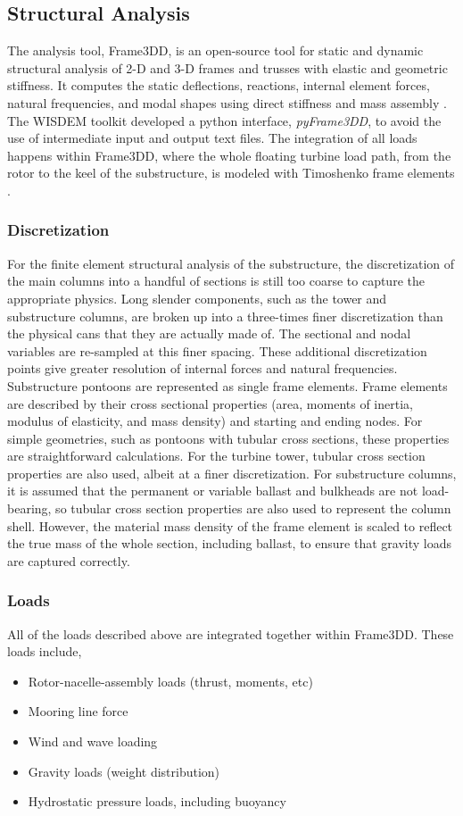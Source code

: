 \subsection{Structural Analysis}
The analysis tool, Frame3DD, is an open-source tool for static and
dynamic structural analysis of 2-D and 3-D frames and trusses with
elastic and geometric stiffness. It computes the static deflections,
reactions, internal element forces, natural frequencies, and modal
shapes using direct stiffness and mass assembly \citep{frame3dd}.  The
WISDEM toolkit developed a python interface, \textit{pyFrame3DD}, to
avoid the use of intermediate input and output text files.  The
integration of all loads happens within Frame3DD, where the whole floating
turbine load path, from the rotor to the keel of the substructure, is
modeled with Timoshenko frame elements \citep{timoshenko}.

\subsubsection{Discretization}
For the finite element structural analysis of the substructure, the
discretization of the main columns into a handful of sections is still
too coarse to capture the appropriate physics. Long slender components,
such as the tower and substructure columns, are broken up into a
three-times finer discretization than the physical cans that they are
actually made of.  The sectional and nodal variables are re-sampled at
this finer spacing.  These additional discretization points give greater
resolution of internal forces and natural frequencies.  Substructure
pontoons are represented as single frame elements.  Frame elements are
described by their cross sectional properties (area, moments of inertia,
modulus of elasticity, and mass density) and starting and ending nodes.
For simple geometries, such as pontoons with tubular cross sections,
these properties are straightforward calculations.  For the turbine
tower, tubular cross section properties are also used, albeit at a finer
discretization.  For substructure columns, it is assumed that the
permanent or variable ballast and bulkheads are not load-bearing, so
tubular cross section properties are also used to represent the column
shell.  However, the material mass density of the frame element is
scaled to reflect the true mass of the whole section, including ballast,
to ensure that gravity loads are captured correctly.

\subsubsection{Loads}
All of the loads described above are integrated together within
Frame3DD.  These loads include,
\begin{itemize}
\item Rotor-nacelle-assembly loads (thrust, moments, etc)
\item Mooring line force
\item Wind and wave loading
\item Gravity loads (weight distribution)
\item Hydrostatic pressure loads, including buoyancy
\end{itemize}

